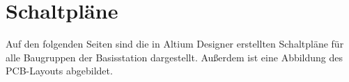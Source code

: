 \section{Schaltpläne}
\label{app:Schematics}
Auf den folgenden Seiten sind die in Altium Designer erstellten Schaltpläne für alle Baugruppen der Basisstation dargestellt. Außerdem ist eine Abbildung des \ac{PCB}-Layouts abgebildet.


 




